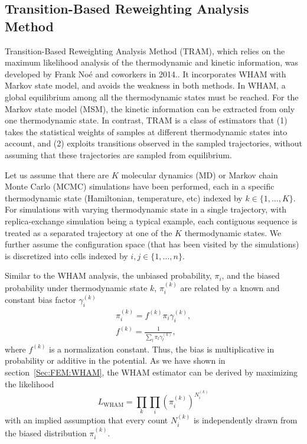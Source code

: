 \subsection{Transition-Based Reweighting Analysis Method\label{Sec:FEM:TRAM}}
Transition-Based Reweighting Analysis Method (TRAM), which relies on the maximum likelihood analysis of the thermodynamic and kinetic information, was developed by Frank No\'{e} and coworkers in 2014.\cite{WuJCP2014}. It incorporates WHAM with Markov state model, and avoids the weakness in both methods. In WHAM, a global equilibrium among all the thermodynamic states must be reached. For the Markov state model (MSM), the kinetic information can be extracted from only one thermodynamic state. In contrast, TRAM is a class of estimators that (1) takes the statistical weights of samples at different thermodynamic states into account, and (2) exploits transitions observed in the sampled trajectories, without assuming that these trajectories are sampled from equilibrium.

Let us assume that there are $K$ molecular dynamics (MD) or Markov chain Monte Carlo (MCMC) simulations have been performed, each in a specific thermodynamic state (Hamiltonian, temperature, etc) indexed by $k\in \{1,\dots,K\}$. For simulations with varying thermodynamic state in a single trajectory, with replica-exchange simulation being a typical example, each contiguous sequence is treated as a separated trajectory at one of the $K$ thermodynamic states. We further assume the configuration space (that has been visited by the simulations) is discretized into cells indexed by $i,j\in \{1,\dots,n\}$. 

Similar to the WHAM analysis, the unbiased probability, $\pi_i$, and the biased probability under thermodynamic state $k$, $\pi_i^{(k)}$ are related by a known and constant bias factor $\gamma_i^{(k)}$
\begin{align}
    \pi_i^{(k)}=f^{(k)}\pi_i\gamma_i^{(k)},\label{Eq:FEM:TRAM:reweight}\\
    f^{(k)}=\frac{1}{\sum_l \pi_l\gamma_l^{(k)}}\label{Eq:FEM:TRAM:f},
\end{align}
where $f^{(k)}$ is a normalization constant. Thus, the bias is multiplicative in probability or additive in the potential. As we have shown in section~\ref{Sec:FEM:WHAM}, the WHAM estimator can be derived by maximizing the likelihood
\begin{equation}
    L_{\mathrm{WHAM}}=\prod\limits_k\prod\limits_i (\pi_i^{(k)})^{N_i^{(k)}}
\end{equation}
with an implied assumption that every count $N_i^{(k)}$ is independently drawn from the biased distribution $\pi_i^{(k)}$.

